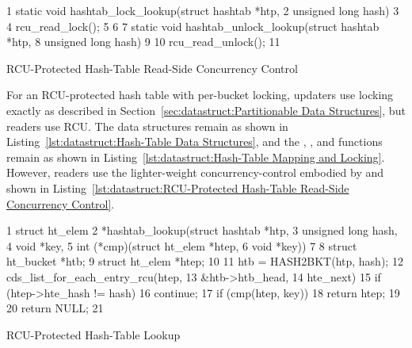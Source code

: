 \begin{listing}[tb]
{ \scriptsize
\begin{verbbox}
 1 static void hashtab_lock_lookup(struct hashtab *htp,
 2                                 unsigned long hash)
 3 {
 4   rcu_read_lock();
 5 }
 6 
 7 static void hashtab_unlock_lookup(struct hashtab *htp,
 8                                   unsigned long hash)
 9 {
10   rcu_read_unlock();
11 }
\end{verbbox}
}
\centering
\theverbbox
\caption{RCU-Protected Hash-Table Read-Side Concurrency Control}
\label{lst:datastruct:RCU-Protected Hash-Table Read-Side Concurrency Control}
\end{listing}

For an RCU-protected hash table with per-bucket locking,
updaters use locking exactly as described in
Section~\ref{sec:datastruct:Partitionable Data Structures},
but readers use RCU.
The data structures remain as shown in
Listing~\ref{lst:datastruct:Hash-Table Data Structures},
and the , , and 
functions remain as shown in
Listing~\ref{lst:datastruct:Hash-Table Mapping and Locking}.
However, readers use the lighter-weight concurrency-control embodied
by  and 
shown in
Listing~\ref{lst:datastruct:RCU-Protected Hash-Table Read-Side Concurrency Control}.

\begin{listing}[tb]
{ \scriptsize
\begin{verbbox}
 1 struct ht_elem
 2 *hashtab_lookup(struct hashtab *htp,
 3                 unsigned long hash,
 4                 void *key,
 5                 int (*cmp)(struct ht_elem *htep,
 6                            void *key))
 7 {
 8   struct ht_bucket *htb;
 9   struct ht_elem *htep;
10 
11   htb = HASH2BKT(htp, hash);
12   cds_list_for_each_entry_rcu(htep,
13                               &htb->htb_head,
14                               hte_next) {
15     if (htep->hte_hash != hash)
16       continue;
17     if (cmp(htep, key))
18       return htep;
19   }
20   return NULL;
21 }
\end{verbbox}
}
\centering
\theverbbox
\caption{RCU-Protected Hash-Table Lookup}
\label{lst:datastruct:RCU-Protected Hash-Table Lookup}
\end{listing}

